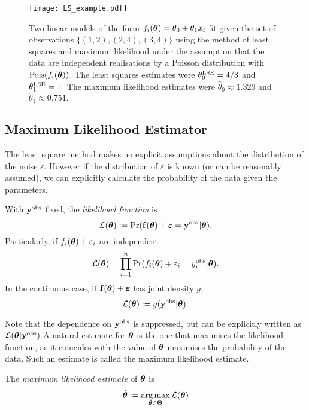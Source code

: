 \begin{figure}[htbp]
    \centering
    \texttt{[image: LS\_example.pdf]}
    \caption{
        Two linear models of the form
        $f_i(\bm{\theta}) = \theta_0 + \theta_1x_i$ fit given the set
        of observations $\{(1, 2), (2, 4), (3, 4)\}$ using the method of
        least squares and maximum likelihood under
        the assumption that the data are independent realisations by a Poisson
        distribution with $\operatorname{Pois}(f_i(\bm{\theta})).$ The least squares estimates
        were $\theta^{\mathrm{LSE}}_0 = 4/3$ and $\theta^{\mathrm{LSE}}_1 = 1.$ The maximum likelihood
        estimates were $\hat{\theta}_0 \approx 1.329$ and
        $\hat{\theta}_1 \approx 0.751.$
    }
    \label{fig:LSE}
\end{figure}

\subsection*{Maximum Likelihood Estimator}

The least square method makes no explicit assumptions about the distribution
of the noise $\varepsilon.$ However if the distribution of $\varepsilon$ is
known (or can be reasonably assumed), we can
explicitly calculate the probability of the data given the parameters.

\begin{definition}
    With $\mathbf{y}^{\mathrm{obs}}$ fixed, the \emph{likelihood function} is
    $$
        \mathcal{L}(\bm{\theta})
        := \Pr(
        \mathbf{f}(\bm{\theta}) + \bm{\varepsilon} = \mathbf{y}^{\mathrm{obs}}
        | \bm{\theta}
        ).
    $$
    Particularly, if $f_i(\bm{\theta}) + \varepsilon_i$ are independent
    $$
        \mathcal{L}(\bm{\theta})
        = \prod_{i = 1}^n
        \Pr(
        f_i(\bm{\theta}) + \varepsilon_i = y_i^{\mathrm{obs}}
        | \bm{\theta}
        ).
    $$
    In the continuous case, if $\mathbf{f}(\bm{\theta}) + \bm{\varepsilon}$
    has joint density $g,$
    $$
        \mathcal{L}(\bm{\theta})
        := g(\mathbf{y}^{\mathrm{obs}} | \bm{\theta}).
    $$
\end{definition}

Note that the dependence on $\mathbf{y}^{\mathrm{obs}}$ is suppressed, but can be
explicitly written as $\mathcal{L}(\bm{\theta}|\mathbf{y}^{\mathrm{obs}})$
A natural estimate for $\bm{\theta}$ is the one that maximises the likelihood
function, as it coincides with the value of $\bm{\theta}$ maximises the
probability of the data. Such an estimate is called the maximum likelihood
estimate.

\begin{definition}
    The \emph{maximum likelihood estimate} of $\bm{\theta}$ is
    $$
        \hat{\bm{\theta}}
        := \operatorname*{arg\,max}_{\bm{\theta}\in\mathbf{\Theta}} \mathcal{L}(\bm{\theta})
    $$
\end{definition}


